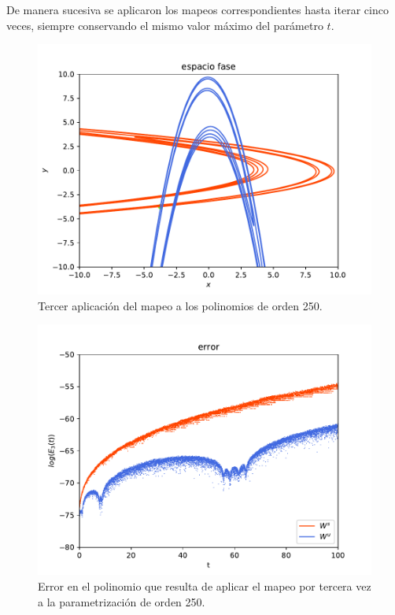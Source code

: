 De manera sucesiva se aplicaron los mapeos correspondientes hasta iterar cinco veces, siempre conservando el mismo valor máximo del parámetro $t$.
\begin{figure}[h!]
\centering
\includegraphics[scale=0.7]{rectangulo3.pdf}
\caption{Tercer aplicación del mapeo a los polinomios de orden 250.}
\label{Rectangulo3}
\end{figure}

\begin{figure}[h!]
\centering
\includegraphics[scale=0.7]{error3ite.pdf}
\caption{Error en el polinomio que resulta de aplicar el mapeo por tercera vez a la parametrización de orden 250.}
\label{error-3iteracion}
\end{figure}


